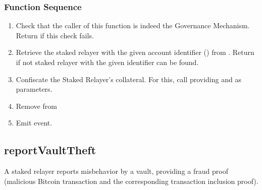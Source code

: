 \documentclass[a4paper,10pt,english]{sphinxmanual}
\begin{document}
\subsubsection{Function Sequence}
\label{\detokenize{spec/staked-relayers:id9}}\begin{enumerate}
%
\item {} 
Check that the caller of this function is indeed the Governance Mechanism. Return  if this check fails.

\item {} 
Retrieve the staked relayer with the given account identifier () from . Return  if not staked relayer with the given identifier can be found.

\item {} 
Confiscate the Staked Relayer’s collateral. For this, call {\hyperref[\detokenize{spec/collateral:slashcollateral}]{}} providing  and  as parameters.

\item {} 
Remove  from 

\item {} 
Emit  event.

\end{enumerate}


\subsection{reportVaultTheft}
\label{\detokenize{spec/staked-relayers:reportvaulttheft}}\label{\detokenize{spec/staked-relayers:id10}}
A staked relayer reports misbehavior by a vault, providing a fraud proof (malicious Bitcoin transaction and the corresponding transaction inclusion proof).
\end{document}
